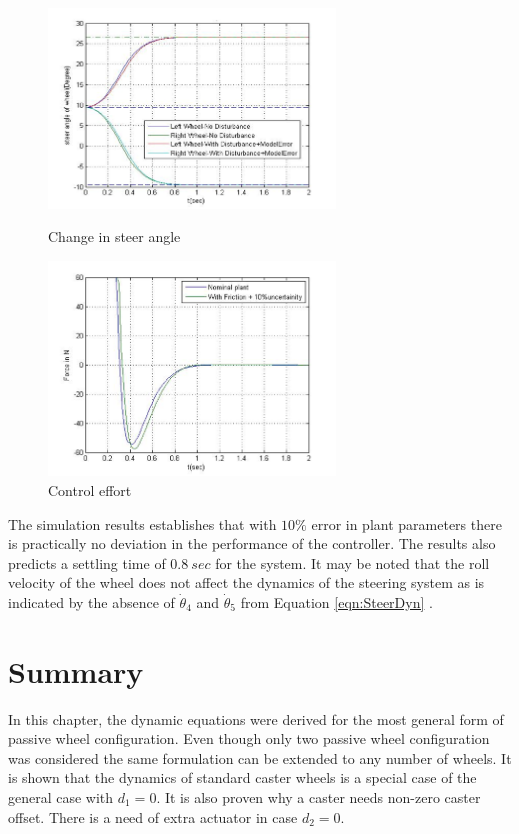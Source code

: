 { 
\begin{figure}
	\begin{minipage}[t]{0.5\textwidth}
		\centering
		\includegraphics[width=3in]{Chapter4/fig/SteeringPos} 
		\caption{Change in steer angle}\label{fig:SteerPos}
	\end{minipage}
	\hfill
	\begin{minipage}[t]{0.5\textwidth}
		\centering
		\includegraphics[width=3in]{Chapter4/fig/SteerEffort} 
		\caption{Control effort}\label{fig:SteerEfort}
	\end{minipage}
\end{figure} 
The simulation results establishes that with $10\%$ error in plant parameters there is practically no deviation in the performance of the controller. The results also predicts a settling time of $0.8~sec$ for the system. It may be noted that the roll velocity of the wheel does not affect the dynamics of the steering system as is indicated by the absence of $\dot\theta_4$ and $\dot\theta_5$  from Equation \ref{eqn:SteerDyn} .
\section{Summary}
In this chapter, the dynamic equations were derived for  the most general form of passive wheel configuration. Even though  only two passive wheel configuration was considered the same formulation can be extended to any number of  wheels. It is shown that the  dynamics of standard caster wheels is a special case of the  general case with $d_1=0$. It is also proven why a caster needs  non-zero caster offset. There is a  need of extra actuator in case $d_2=0$. 

}
